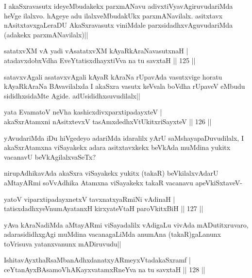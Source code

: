 \begin{artha}
I akaSxravasutx ideyeMbudakekx parxmANavu adivxtiVyavAgiruvudariMda heVge ilalxvo. hAgeye adu ilalxveMbudakUkx parxmANavilalx. asitxtavx nAsitxtavxgaLeraDU AkaSxravasutx viniMdale parxsidadhxvAguvudariMda (adakekx parxmANavilalx)||
\end{artha}

\begin{shl}
satatxvXM vA yadi vA\s satatxvXM kAyaRkAraNavasutxnaH |\\
atadavxdobxVdha EveYtatisxdhayxtiVva na tu savxtaH \hfill || 125 ||
\end{shl}

\begin{artha}%
satavxvAgali asatavxvAgali kAyaR kAraNa rUpavAda vasutxvige horatu kAyaRkAraNa BAvavilalxda I akaSxra vasutx keVvala boVdha rUpaveV eMbudu sididhxsidaMte Agide. adUsididhxsuvudilalx||
\end{artha}


\begin{shl}
yata EvamatoV neVha kashicxdivxparxtipadayxteV |\\
akaSxrAtamxni nAsitxtevxV tasAmxdedhxVtUkitxriSayxteV \hfill || 126 ||
\end{shl}

\begin{artha}
yAvudariMda iDu hiVgedeyo adariMda idaralilx yArU saMshayapaDuvudilalx, I akaSxrAtamxna viSayakekx adara asitxtavxkekx beVkAda muMdina yukitx vacanavU beVkAgilalxvaSeTx?

nirupAdhikavAda akaSxra viSayakekx yukitx (takaR) beVkilalxvAdarU aMtayARmi soVvAdhika Atamxna viSayakekx takaR vacanavu apeVkiSxtaveV-
\end{artha}

\begin{shl}
yatoV viparxtipadayxnetxV tavxnatxyaRmiNi vAdinaH |\\
tatisxdadhxyeV\s numAyatanxH kirxyateV\s taH paroVkitxBiH \hfill || 127 ||
\end{shl}

\begin{artha}
yAva kAraNadiMda aMtayARmi viSayadalilx vAdigaLu vivAda mADutitxruvaro, adarasididhxgAgi muMdina vacanagaLiMda anumAna (takaR)gaLanunx toVrisuva yatanxvanunx mADiruvudu||
\end{artha}

\begin{shl}
IshitavAyxthaRsaMbanAdhxdanatxyARmeyxVtadakaSxramf |\\
ceYtanAyxBAsamoVhAKayxvatamxRneYva na tu savxtaH \hfill || 128 ||
\end{shl}

